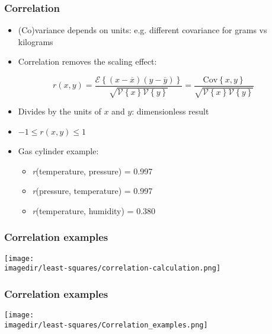 \begin{frame}\frametitle{Correlation}
	\begin{itemize}
		\item	(Co)variance depends on units: e.g. different covariance for grams vs kilograms 
		\item	Correlation removes the scaling effect: 
	\end{itemize}
	
	$$r(x, y) = \dfrac{\mathcal{E}\left\{ (x - \overline{x}) (y - \overline{y})\right\}}{\sqrt{\mathcal{V}\left\{x\right\}\mathcal{V}\left\{y\right\}}} = \dfrac{\text{Cov}\left\{x, y\right\}}{\sqrt{\mathcal{V}\left\{x\right\}\mathcal{V}\left\{y\right\}}}$$
	\begin{itemize}
		\item	Divides by the units of $x$ and $y$: dimensionless result 
		\item	$-1 \leq r(x,y) \leq 1$ 
	\end{itemize}
	\begin{itemize}
		\item	Gas cylinder example: 
		\begin{itemize}
			\item	\emph{r}(temperature, pressure) = 0.997 
			\item	\emph{r}(pressure, temperature) = 0.997 
			\item	\emph{r}(temperature, humidity) = 0.380 
		\end{itemize}
	\end{itemize}
\end{frame}

\begin{frame}\frametitle{Correlation examples}
	\begin{center}
		\texttt{[image: \\imagedir/least-squares/correlation-calculation.png]}
	\end{center}
\end{frame}

\begin{frame}\frametitle{Correlation examples}
	\begin{center}
		\texttt{[image: \\imagedir/least-squares/Correlation\_examples.png]}
	\end{center}
\end{frame}

